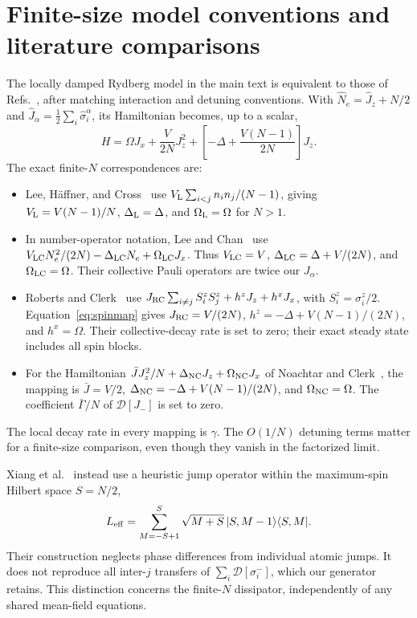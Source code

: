 \documentclass[aps,pra,10pt,onecolumn,superscriptaddress,amsmath,amssymb]{revtex4-2}
\begin{document}
\section{Finite-size model conventions and literature comparisons}
The locally damped Rydberg model in the main text is equivalent to those of Refs.~\cite{Lee2012,LeeChan2013}, after matching interaction and detuning conventions. With $\hat N_e=\hat J_z+N/2$ and $\hat J_\alpha=\frac12\sum_i\hat\sigma_i^\alpha$, its Hamiltonian becomes, up to a scalar,
\begin{equation}
 H=\Omega J_x+\frac{V}{2N}J_z^2+
 \left[-\Delta+\frac{V(N-1)}{2N}\right]J_z.
 \label{eq:spinmap}
\end{equation}
The exact finite-$N$ correspondences are:
\begin{itemize}
\item Lee, H\"affner, and Cross~\cite{Lee2012} use $V_{\rm L}\sum_{i<j}n_i n_j/(N-1)$, giving $V_{\rm L}=V(N-1)/N$, $\Delta_{\rm L}=\Delta$, and $\Omega_{\rm L}=\Omega$ for $N>1$.
\item In number-operator notation, Lee and Chan~\cite{LeeChan2013} use $V_{\rm LC}N_e^2/(2N)-\Delta_{\rm LC}N_e+\Omega_{\rm LC}J_x$. Thus $V_{\rm LC}=V$, $\Delta_{\rm LC}=\Delta+V/(2N)$, and $\Omega_{\rm LC}=\Omega$. Their collective Pauli operators are twice our $J_\alpha$.
\item Roberts and Clerk~\cite{RobertsClerk2023} use $J_{\rm RC}\sum_{i\ne j}S_i^zS_j^z+h^zJ_z+h^xJ_x$, with $S_i^z=\sigma_i^z/2$. Equation~\eqref{eq:spinmap} gives $J_{\rm RC}=V/(2N)$, $h^z=-\Delta+V(N-1)/(2N)$, and $h^x=\Omega$. Their collective-decay rate is set to zero; their exact steady state includes all spin blocks.
\item For the Hamiltonian $\bar J J_z^2/N+\Delta_{\rm NC}J_z+\Omega_{\rm NC}J_x$ of Noachtar and Clerk~\cite{NoachtarClerk2026}, the mapping is $\bar J=V/2$, $\Delta_{\rm NC}=-\Delta+V(N-1)/(2N)$, and $\Omega_{\rm NC}=\Omega$. The coefficient $\bar\Gamma/N$ of $\mathcal D[J_-]$ is set to zero.
\end{itemize}
The local decay rate in every mapping is $\gamma$. The $O(1/N)$ detuning terms matter for a finite-size comparison, even though they vanish in the factorized limit.

Xiang et al.~\cite{Xiang2026} instead use a heuristic jump operator within the maximum-spin Hilbert space $S=N/2$,
\begin{equation}
 L_{\rm eff}=\sum_{M=-S+1}^{S}\sqrt{M+S}\,|S,M-1\rangle\langle S,M|.
\end{equation}
Their construction neglects phase differences from individual atomic jumps. It does not reproduce all inter-$j$ transfers of $\sum_i\mathcal D[\sigma_i^-]$, which our generator retains. This distinction concerns the finite-$N$ dissipator, independently of any shared mean-field equations.
\end{document}

